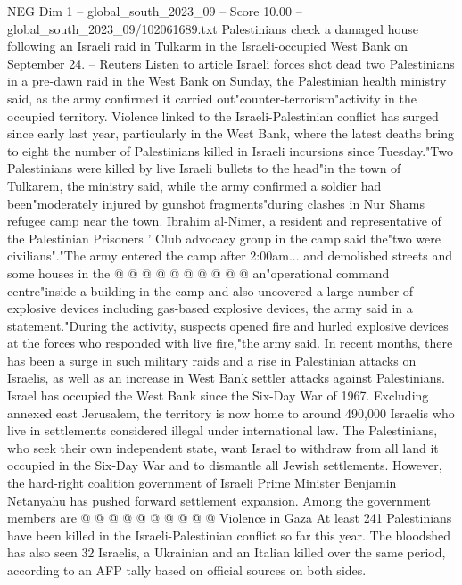 \begin{textsample}{NEG Dim 1 – global\_south\_2023\_09 – Score 10.00 – global\_south\_2023\_09/102061689.txt}  \label{ex:f1_neg_006}
Palestinians check a damaged house following an Israeli raid in Tulkarm in the Israeli-occupied West Bank on September 24. -- Reuters Listen to article Israeli forces shot dead two Palestinians in a pre-dawn raid in the West Bank on Sunday, the Palestinian health ministry said, as the army confirmed it carried out"counter-terrorism"activity in the occupied territory.
Violence linked to the Israeli-Palestinian conflict has surged since early last year, particularly in the West Bank, where the latest deaths bring to eight the number of Palestinians killed in Israeli incursions since Tuesday."Two Palestinians were killed by live Israeli bullets to the head"in the town of Tulkarem, the ministry said, while the army confirmed a soldier had been"moderately injured by gunshot fragments"during clashes in Nur Shams refugee camp near the town.
Ibrahim al-Nimer, a resident and representative of the Palestinian Prisoners ' Club advocacy group in the camp said the"two were civilians"."The army entered the camp after 2:00am... and demolished streets and some houses in the @ @ @ @ @ @ @ @ @ @ an"operational command centre"inside a building in the camp and also uncovered a large number of explosive devices including gas-based explosive devices, the army said in a statement."During the activity, suspects opened fire and hurled explosive devices at the forces who responded with live fire,"the army said.
In recent months, there has been a surge in such military raids and a rise in Palestinian attacks on Israelis, as well as an increase in West Bank settler attacks against Palestinians.
Israel has occupied the West Bank since the Six-Day War of 1967.
Excluding annexed east Jerusalem, the territory is now home to around 490,000 Israelis who live in settlements considered illegal under international law.
The Palestinians, who seek their own independent state, want Israel to withdraw from all land it occupied in the Six-Day War and to dismantle all Jewish settlements.
However, the hard-right coalition government of Israeli Prime Minister Benjamin Netanyahu has pushed forward settlement expansion.
Among the government members are @ @ @ @ @ @ @ @ @ @ Violence in Gaza At least 241 Palestinians have been killed in the Israeli-Palestinian conflict so far this year.
The bloodshed has also seen 32 Israelis, a Ukrainian and an Italian killed over the same period, according to an AFP tally based on official sources on both sides.

\end{textsample}
